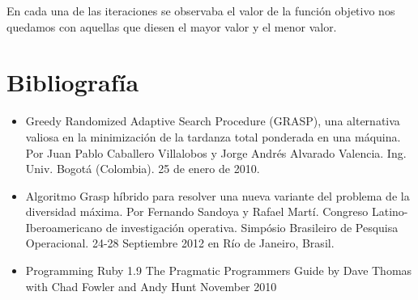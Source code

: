 \documentclass[12pt,a4paper,draft,openany]{article}
\begin{document}
En cada una de las iteraciones se observaba el valor de la función objetivo nos quedamos con
aquellas que diesen el mayor valor y el menor valor.

\newpage
\section*{Bibliografía}

\begin{itemize}
\item Greedy Randomized Adaptive Search
Procedure (GRASP), una alternativa
valiosa en la minimización de la tardanza
total ponderada en una máquina. Por Juan Pablo Caballero Villalobos y Jorge Andrés Alvarado Valencia. Ing. Univ. Bogotá (Colombia). 25 de enero de 2010.

\item Algoritmo Grasp híbrido para resolver una nueva variante del problema de la diversidad máxima. Por Fernando Sandoya y Rafael Martí. Congreso Latino-Iberoamericano de investigación operativa. Simpósio Brasileiro de Pesquisa Operacional. 24-28 Septiembre 2012 en Río de Janeiro, Brasil.

\item Programming Ruby 1.9 The Pragmatic Programmers Guide by Dave Thomas with Chad Fowler and Andy Hunt November 2010


\end{itemize}
\end{document}
